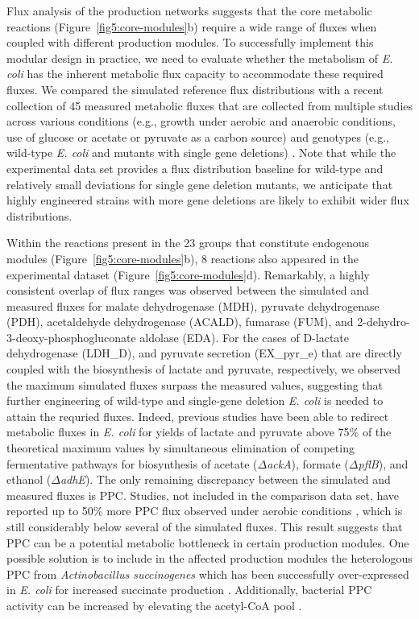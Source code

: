 Flux analysis of the production networks suggests that the core metabolic reactions (Figure~\ref{fig5:core-modules}b) require a wide range of fluxes when coupled with different production modules. To successfully implement this modular design in practice, we need to evaluate whether the metabolism of \textit{E. coli} has the inherent metabolic flux capacity to accommodate these required fluxes.
We compared the simulated reference flux distributions with a recent collection of 45 measured metabolic fluxes \citep{khodayari2016} that are collected from multiple studies across various conditions (e.g., growth under aerobic and anaerobic conditions, use of glucose or acetate or pyruvate as a carbon source) and genotypes (e.g., wild-type \textit{E. coli} and mutants with single gene deletions) \citep{ishii2007, kabir2005, zhao2004, zhao2003}.
Note that while the experimental data set provides a flux distribution baseline for wild-type and relatively small deviations for single gene deletion mutants, we anticipate that highly engineered strains with more gene deletions are likely to exhibit wider flux distributions.

Within the reactions present in the 23 groups that constitute endogenous modules (Figure~\ref{fig5:core-modules}b), 8 reactions also appeared in the experimental dataset (Figure~\ref{fig5:core-modules}d).
Remarkably, a highly consistent overlap of flux ranges was observed between the simulated and measured fluxes for malate dehydrogenase (MDH), pyruvate dehydrogenase (PDH), acetaldehyde dehydrogenase (ACALD), fumarase (FUM), and 2-dehydro-3-deoxy-phosphogluconate aldolase (EDA).
For the cases of  D-lactate dehydrogenase (LDH\_D), and pyruvate secretion (EX\_pyr\_e) that are directly coupled with the biosynthesis of lactate and pyruvate, respectively, we observed the maximum simulated fluxes surpass the measured values, suggesting that further engineering of wild-type and single-gene deletion \textit{E. coli} is needed to attain the requried fluxes.
Indeed, previous studies\citep{zhou2003, causey2004} have been able to redirect metabolic fluxes in \textit{E. coli} for yields of lactate and pyruvate above 75\% of the theoretical maximum values by simultaneous elimination of competing fermentative pathways for biosynthesis of acetate ($\Delta$\textit{ackA}), formate ($\Delta$\textit{pflB}), and ethanol ($\Delta$\textit{adhE}).
The only remaining discrepancy between the simulated and measured fluxes is PPC.
Studies, not included in the comparison data set, have reported up to 50\% more PPC flux observed under aerobic conditions \citep{peng2004, siddiquee2004}, which is still considerably below several of the simulated fluxes.
This result suggests that PPC can be a potential metabolic bottleneck in certain production modules. One possible solution is to include in the affected production modules the heterologous PPC from \textit{Actinobacillus succinogenes} which has been successfully over-expressed in \textit{E. coli} for increased succinate production \citep{kim2004}.
Additionally, bacterial PPC activity can be increased by elevating the acetyl-CoA pool \citep{lin2004}.


